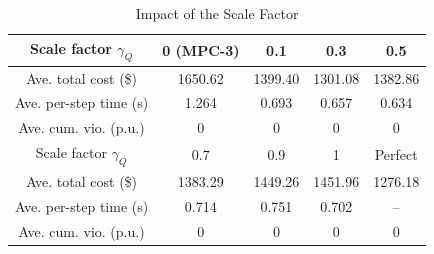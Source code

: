 \begin{table}[!t]
\caption{Impact of the Scale Factor\label{tab:scale factor}}
\centering
\begin{tabular}{ccccc}
\toprule
Scale factor $\gamma_Q$ & 0 (MPC-3) & 0.1 & 0.3 & 0.5 \\
\midrule
Ave. total cost (\$) & 1650.62 & 1399.40 & 1301.08 & 1382.86 \\
Ave. per-step time (s) & 1.264 & 0.693 & 0.657 & 0.634 \\
Ave. cum. vio. (p.u.) & 0 & 0 & 0 & 0 \\
\midrule
Scale factor $\gamma_Q$ & 0.7 & 0.9 & 1 & Perfect \\
\midrule
Ave. total cost (\$) & 1383.29 & 1449.26 & 1451.96 & 1276.18 \\
Ave. per-step time (s) & 0.714 & 0.751 & 0.702 & -- \\
Ave. cum. vio. (p.u.) & 0 & 0 & 0 & 0 \\
\bottomrule
\end{tabular}
\end{table}
